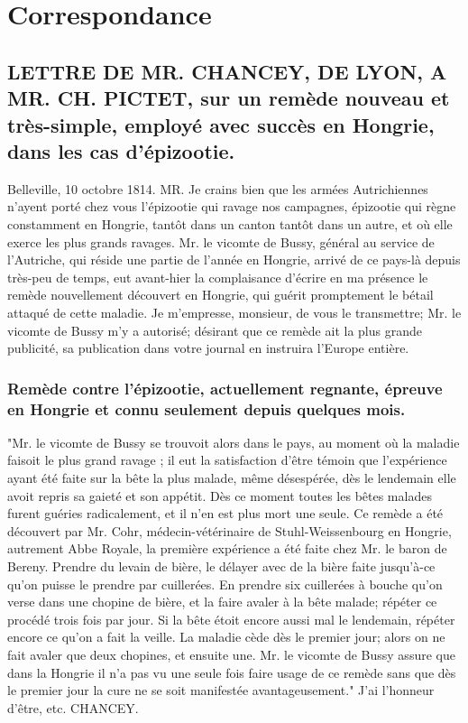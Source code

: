 \setcounter{page}{371}
\chapter{Correspondance}
\section{LETTRE DE MR. CHANCEY, DE LYON, A MR. CH. PICTET, sur un remède nouveau et très-simple, employé avec succès en Hongrie, dans les cas d'épizootie.}
Belleville, 10 octobre 1814.
MR.
Je crains bien que les armées Autrichiennes n'ayent porté chez vous l'épizootie qui ravage nos campagnes, épizootie qui règne constamment en Hongrie, tantôt dans un canton tantôt dans un autre, et où elle exerce les plus grands ravages.
Mr. le vicomte de Bussy, général au service de l'Autriche, qui réside une partie de l'année en Hongrie, arrivé de ce pays-là depuis très-peu de temps, eut avant-hier la complaisance d'écrire en ma présence le remède nouvellement découvert en Hongrie, qui guérit\setcounter{page}{372} promptement le bétail attaqué de cette maladie. Je m'empresse, monsieur, de vous le transmettre; Mr. le vicomte de Bussy m'y a autorisé; désirant que ce remède ait la plus grande publicité, sa publication dans votre journal en instruira l'Europe entière.
\subsection{Remède contre l'épizootie, actuellement regnante, épreuve en Hongrie et connu seulement depuis quelques mois.}
"Mr. le vicomte de Bussy se trouvoit alors dans le pays, au moment où la maladie faisoit le plus grand ravage ; il eut la satisfaction d'être témoin que l'expérience ayant été faite sur la bête la plus malade, même désespérée, dès le lendemain elle avoit repris sa gaieté et son appétit. Dès ce moment toutes les bêtes malades furent guéries radicalement, et il n'en est plus mort une seule.
Ce remède a été découvert par Mr. Cohr, médecin-vétérinaire de Stuhl-Weissenbourg en Hongrie, autrement Abbe Royale, la première expérience a été faite chez Mr. le baron de Bereny.
Prendre du levain de bière, le délayer avec de la bière faite jusqu'à-ce qu'on puisse le prendre par cuillerées.
En prendre six cuillerées à bouche qu'on verse dans une chopine de bière, et la faire avaler à la bête malade; répéter ce procédé trois fois par jour. Si la bête étoit encore aussi mal le lendemain, répéter encore ce qu'on a fait la veille. La maladie cède dès le premier jour; alors on ne fait avaler que deux chopines, et ensuite une.
Mr. le vicomte de Bussy assure que dans la Hongrie il n'a pas vu une seule fois faire usage de ce remède sans que dès le premier jour la cure ne se soit manifestée avantageusement."
J'ai l'honneur d'être, etc.
CHANCEY.
